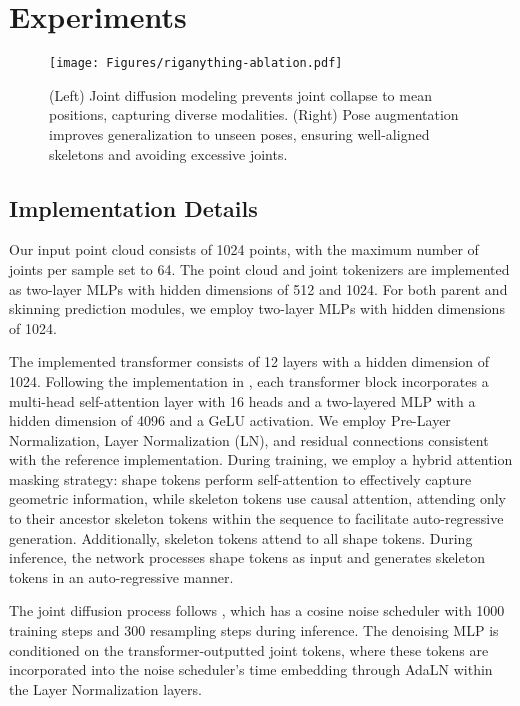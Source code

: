 \section{Experiments}

\begin{figure}[t]
\texttt{[image: Figures/riganything-ablation.pdf]}
\caption{(Left) Joint diffusion modeling prevents joint collapse to mean positions, capturing diverse modalities. (Right) Pose augmentation improves generalization to unseen poses, ensuring well-aligned skeletons and avoiding excessive joints.}
\label{fig:ablation_diffusion}
\vspace{-5mm}
\end{figure}

\subsection{Implementation Details}

Our input point cloud consists of 1024 points, with the maximum number of joints per sample set to 64. The point cloud and joint tokenizers are implemented as two-layer MLPs with hidden dimensions of 512 and 1024. For both parent and skinning prediction modules, we employ two-layer MLPs with hidden dimensions of 1024.

The implemented transformer consists of 12 layers with a hidden dimension of 1024. Following the implementation in \cite{zhang2025gs}, each transformer block incorporates a multi-head self-attention layer with 16 heads and a two-layered MLP with a hidden dimension of 4096 and a GeLU activation. We employ Pre-Layer Normalization, Layer Normalization (LN), and residual connections consistent with the reference implementation. During training, we employ a hybrid attention masking strategy: shape tokens perform self-attention to effectively capture geometric information, while skeleton tokens use causal attention, attending only to their ancestor skeleton tokens within the sequence to facilitate auto-regressive generation. Additionally, skeleton tokens attend to all shape tokens. During inference, the network processes shape tokens as input and generates skeleton tokens in an auto-regressive manner.

The joint diffusion process follows \cite{nichol2021improved, li2024autoregressive}, which has a cosine noise scheduler with 1000 training steps and 300 resampling steps during inference. The denoising MLP is conditioned on the transformer-outputted joint tokens, where these tokens are incorporated into the noise scheduler's time embedding through AdaLN \cite{peebles2023scalable} within the Layer Normalization layers.

